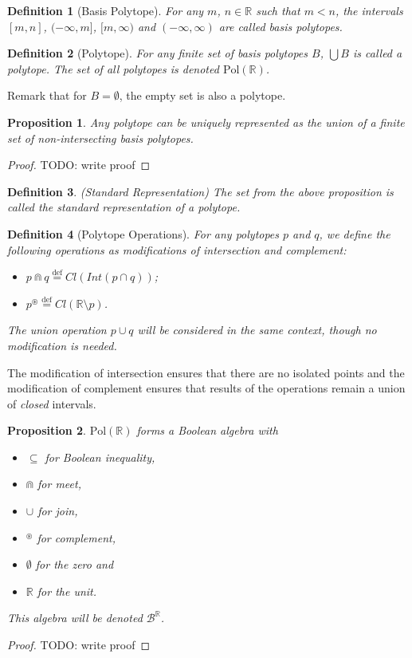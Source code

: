 \documentclass{article}
\newtheorem*{definition}{Definition}
\newtheorem*{proposition}{Proposition}
\newcommand{\R}{\mathbb{R}}
\newcommand{\B}{\mathcal{B}}
\newcommand{\bcup}{\cup}
\newcommand{\bcap}{\Cap}
\newcommand{\bstar}{^\circledast}
\newcommand{\Pol}{\text{Pol}}
\newcommand{\eqdef}{\stackrel{\text{def}}{=}}
\begin{document}
\begin{definition}[Basis Polytope]
For any $m$, $n \in \R$ such that $m < n$, the intervals $[m, n]$, $(-\infty, m]$, $[m, \infty)$ and $(-\infty, \infty)$ are called \emph{basis polytopes}.
\end{definition}

\begin{definition}[Polytope]
For any finite set of basis polytopes $B$, $\bigcup B$ is called a \emph{polytope}. The set of all polytopes is denoted $\Pol(\R)$.
\end{definition}

Remark that for $B = \emptyset$, the empty set is also a polytope.

\begin{proposition}
Any polytope can be uniquely represented as the union of a finite set of non-intersecting basis polytopes.
\end{proposition}
\begin{proof}
  TODO: write proof
\end{proof}

\begin{definition}(Standard Representation)
The set from the above proposition is called the \emph{standard representation} of a polytope.
\end{definition}

\begin{definition}[Polytope Operations]
For any polytopes $p$ and $q$, we define the following operations as modifications of intersection and complement:
\begin{itemize}
  \item $p \bcap q \eqdef Cl(Int(p \cap q))$;
  \item $p \bstar \eqdef Cl(\R \setminus p) $.
\end{itemize}
The union operation $p \bcup q$ will be considered in the same context, though no modification is needed.
\end{definition}

The modification of intersection ensures that there are no isolated points and the modification of complement ensures that results of the operations remain a union of \emph{closed} intervals.

\begin{proposition}
$\Pol(\R)$ forms a Boolean algebra with
  \begin{itemize}
  \item $\subseteq$ for Boolean inequality,
  \item $\bcap$ for meet,
  \item $\bcup$ for join,
  \item $\bstar$ for complement,
  \item $\emptyset$ for the zero and
  \item $\R$ for the unit.
\end{itemize}
This algebra will be denoted $\B^\R$.
\end{proposition}
\begin{proof}
  TODO: write proof
\end{proof}
\end{document}

